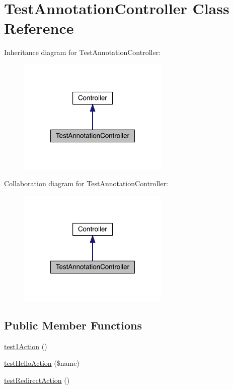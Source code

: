 \hypertarget{class_test_annotation_controller}{\section{Test\-Annotation\-Controller Class Reference}
\label{class_test_annotation_controller}
}


Inheritance diagram for Test\-Annotation\-Controller\-:
\nopagebreak
\begin{figure}[H]
\begin{center}
\leavevmode
\includegraphics[width=204pt]{class_test_annotation_controller__inherit__graph}
\end{center}
\end{figure}


Collaboration diagram for Test\-Annotation\-Controller\-:
\nopagebreak
\begin{figure}[H]
\begin{center}
\leavevmode
\includegraphics[width=204pt]{class_test_annotation_controller__coll__graph}
\end{center}
\end{figure}
\subsection*{Public Member Functions}
\begin{DoxyCompactItemize}
\item 
\hyperlink{class_test_annotation_controller_a4fd6487034472ff3228fec7538267101}{test1\-Action} ()
\item 
\hyperlink{class_test_annotation_controller_afb14bcbfc7400c60a51e30a9db6538ba}{test\-Hello\-Action} (\$name)
\item 
\hyperlink{class_test_annotation_controller_a1bf7c4b8606d7d9697516b1624156081}{test\-Redirect\-Action} ()
\end{DoxyCompactItemize}
